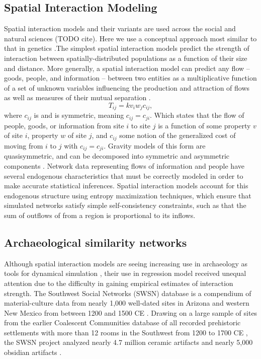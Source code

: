 \documentclass[10pt]{iopart}
\begin{document}
\subsection*{Spatial Interaction Modeling}
Spatial interaction models and their variants are used across the social and natural sciences (TODO cite). Here we use a conceptual approach most similar to that in genetics \parencite{Murphy2010}.The simplest spatial interaction models predict the strength of interaction between spatially-distributed populations as a function of their size and distance. More generally, a spatial interaction model can predict any flow -- goods, people, and information -- between two entities as a multiplicative function of a set of unknown variables influencing the production and attraction of flows as well as measures of their mutual separation \parencite{sen and smith,fotheringham}.
\begin{equation}
    T_{ij} = k v_i w_j c_{ij},
\end{equation}
where $c_{ij}$ is  and is symmetric, meaning $c_{ij} = c_{ji}$. Which states that the flow of people, goods, or information from site $i$ to site $j$ is a function of some property $v$ of site $i$, property $w$ of site $j$, and $c_{ij}$ some notion of the generalized cost of moving from $i$ to $j$ with $c_{ij} = c_{ji}$. Gravity models of this form are quasisymmetric, and can be decomposed into symmetric and asymmetric components \parencite{Bavaud2002,Bavaud2008}. Network data representing flows of information and people have several endogenous characteristics that must be correctly modeled in order to make accurate statistical inferences. Spatial interaction models account for this endogenous structure using entropy maximization techniques, which ensure that simulated networks satisfy simple self-consistency constraints, such as that the sum of outflows of from a region is proportional to its inflows.

\subsection*{Archaeological similarity networks}
Although spatial interaction models are seeing increasing use in archaeology as tools for dynamical simulation \parencite{bevanwilson2011, riversevans}, their use in regression model received unequal attention \parencite{Johnson1990ChumashAnalysis,cappadocianspeculation,Hodder1974} due to the difficulty in gaining empirical estimates of interaction strength. The Southwest Social Networks (SWSN) database is a compendium of material-culture data from nearly 1,000 well-dated sites in Arizona and western New Mexico from between 1200 and 1500 CE \parencite{Mills2012,Mills2013a,Peeples2013,Borck2015,Hill2015,Mills2015a}. Drawing on a large sample of sites from the earlier Coalescent Communities database of all recorded prehistoric settlements with more than 12 rooms in the Southwest from 1200 to 1700 CE \parencite{Hill2004}, the SWSN project analyzed nearly 4.7 million ceramic artifacts and nearly 5,000 obsidian artifacts \parencite{Mills2015a}.
\end{document}
